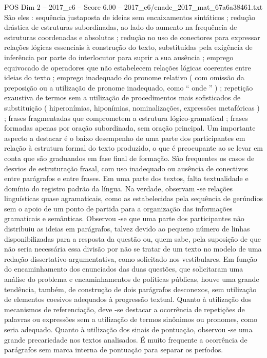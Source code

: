 \begin{textsample}{POS Dim 2 – 2017\_c6 – Score 6.00 – 2017\_c6/enade\_2017\_mat\_67a6a38461.txt}
São eles : sequência justaposta de ideias sem encaixamentos sintáticos ; redução drástica de estruturas subordinadas, ao lado do aumento na frequência de estruturas coordenadas e absolutas ; redução no uso de conectores para expressar relações lógicas essenciais à construção do texto, substituídas pela exigência de inferência por parte do interlocutor para suprir a sua ausência ; emprego equivocado de operadores que não estabelecem relações lógicas coerentes entre ideias do texto ; emprego inadequado do pronome relativo ( com omissão da preposição ou a utilização de pronome inadequado, como “ onde ” ) ; repetição exaustiva de termos sem a utilização de procedimentos mais sofisticados de substituição ( hiperonímias, hiponímias, nominalizações, expressões metafóricas ) ; frases fragmentadas que comprometem a estrutura lógico-gramatical ; frases formadas apenas por oração subordinada, sem oração principal.
Um importante aspecto a destacar é o baixo desempenho de uma parte dos participantes em relação à estrutura formal do texto produzido, o que é preocupante ao se levar em conta que são graduandos em fase final de formação.
São frequentes os casos de desvios de estruturação frasal, com uso inadequado ou ausência de conectivos entre parágrafos e entre frases.
Em uma parte dos textos, falta textualidade e domínio do registro padrão da língua.
Na verdade, observam -se relações linguísticas quase agramaticais, como as estabelecidas pela sequência de gerúndios sem o apoio de um ponto de partida para a organização das informações gramaticais e semânticas.
Observou -se que uma parte dos participantes não distribuiu as ideias em parágrafos, talvez devido ao pequeno número de linhas disponibilizadas para a resposta da questão ou, quem sabe, pela suposição de que não seria necessária essa divisão por não se tratar de um texto no modelo de uma redação dissertativo-argumentativa, como solicitado nos vestibulares.
Em função do encaminhamento dos enunciados das duas questões, que solicitaram uma análise do problema e encaminhamentos de políticas públicas, houve uma grande tendência, também, de construção de dois parágrafos desconexos, sem utilização de elementos coesivos adequados à progressão textual.
Quanto à utilização dos mecanismos de referenciação, deve -se destacar a ocorrência de repetições de palavras ou expressões sem a utilização de termos sinônimos ou pronomes, como seria adequado.
Quanto à utilização dos sinais de pontuação, observou -se uma grande precariedade nos textos analisados.
É muito frequente a ocorrência de parágrafos sem marca interna de pontuação para separar os períodos.

\end{textsample}
